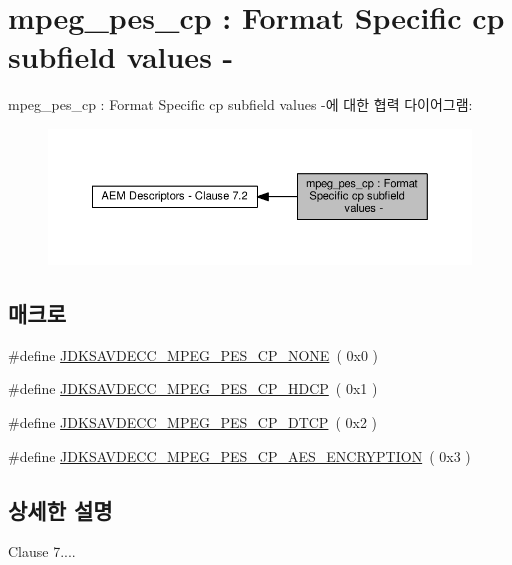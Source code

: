 \hypertarget{group__mpeg__pes__cp}{}\section{mpeg\+\_\+pes\+\_\+cp \+: Format Specific cp subfield values -\/}
\label{group__mpeg__pes__cp}
mpeg\+\_\+pes\+\_\+cp \+: Format Specific cp subfield values -\/에 대한 협력 다이어그램\+:
\nopagebreak
\begin{figure}[H]
\begin{center}
\leavevmode
\includegraphics[width=350pt]{group__mpeg__pes__cp}
\end{center}
\end{figure}
\subsection*{매크로}
\begin{DoxyCompactItemize}
\item 
\#define \hyperlink{group__mpeg__pes__cp_gaf8c01b13e177f45af653922ef3bf4cdb}{J\+D\+K\+S\+A\+V\+D\+E\+C\+C\+\_\+\+M\+P\+E\+G\+\_\+\+P\+E\+S\+\_\+\+C\+P\+\_\+\+N\+O\+NE}~( 0x0 )
\item 
\#define \hyperlink{group__mpeg__pes__cp_ga70cec6593418868b3b6a685ec4a7b94f}{J\+D\+K\+S\+A\+V\+D\+E\+C\+C\+\_\+\+M\+P\+E\+G\+\_\+\+P\+E\+S\+\_\+\+C\+P\+\_\+\+H\+D\+CP}~( 0x1 )
\item 
\#define \hyperlink{group__mpeg__pes__cp_gad5448d29d7b743061b6a0df6514628d2}{J\+D\+K\+S\+A\+V\+D\+E\+C\+C\+\_\+\+M\+P\+E\+G\+\_\+\+P\+E\+S\+\_\+\+C\+P\+\_\+\+D\+T\+CP}~( 0x2 )
\item 
\#define \hyperlink{group__mpeg__pes__cp_ga64fc8a03fb16672c518f6be4ed13dce3}{J\+D\+K\+S\+A\+V\+D\+E\+C\+C\+\_\+\+M\+P\+E\+G\+\_\+\+P\+E\+S\+\_\+\+C\+P\+\_\+\+A\+E\+S\+\_\+\+E\+N\+C\+R\+Y\+P\+T\+I\+ON}~( 0x3 )
\end{DoxyCompactItemize}


\subsection{상세한 설명}
Clause 7.... 

